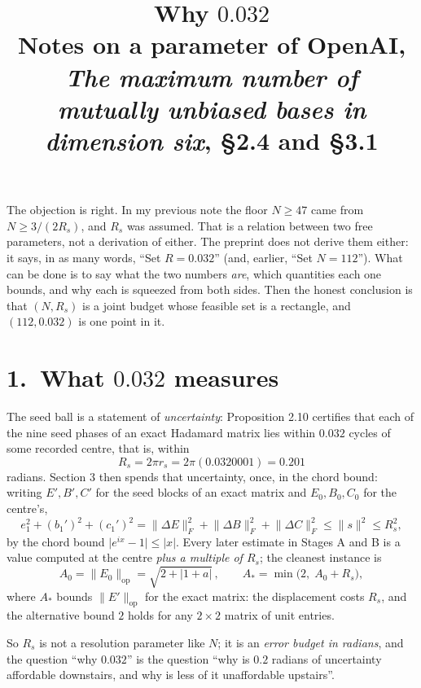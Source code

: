 \documentclass[11pt]{article}
\title{\bfseries Why $0.032$\\[6pt]
\large\normalfont Notes on a parameter of OpenAI, \emph{The maximum number of\\[1pt]
mutually unbiased bases in dimension six}, \S2.4 and \S3.1}
\author{}
\date{}
\newcommand{\abs}[1]{\lvert #1\rvert}
\newcommand{\norm}[1]{\lVert #1\rVert}
\begin{document}
\maketitle
\vspace{-2.6em}

\noindent
The objection is right. In my previous note the floor $N\ge47$ came from $N\ge 3/(2R_s)$, and $R_s$
was assumed. That is a relation between two free parameters, not a derivation of either. The preprint
does not derive them either: it says, in as many words, ``Set $R=0.032$'' (and, earlier, ``Set
$N=112$''). What can be done is to say what the two numbers \emph{are}, which quantities each one
bounds, and why each is squeezed from both sides. Then the honest conclusion is that $(N,R_s)$ is a
joint budget whose feasible set is a rectangle, and $(112,0.032)$ is one point in it.

\section*{1.\ What $0.032$ measures}

The seed ball is a statement of \emph{uncertainty}: Proposition 2.10 certifies that each of the nine
seed phases of an exact Hadamard matrix lies within $0.032$ cycles of some recorded centre, that is,
within
\[
R_s=2\pi r_s=2\pi(0.0320001)=0.201
\]
radians. Section 3 then spends that uncertainty, once, in the chord bound: writing $E',B',C'$ for the
seed blocks of an exact matrix and $E_0,B_0,C_0$ for the centre's,
\begin{equation}\label{eq:chord}
e_1^2+(b_1')^2+(c_1')^2=\norm{\Delta E}_F^2+\norm{\Delta B}_F^2+\norm{\Delta C}_F^2\le\norm{s}^2\le R_s^2 ,
\end{equation}
by the chord bound $\abs{e^{ix}-1}\le\abs{x}$. Every later estimate in Stages A and B is a value
computed at the centre \emph{plus a multiple of $R_s$}; the cleanest instance is
\begin{equation}\label{eq:Astar}
A_0=\norm{E_0}_{\mathrm{op}}=\sqrt{2+\abs{1+a}}\,,
\qquad A_*=\min\bigl(2,\;A_0+R_s\bigr),
\end{equation}
where $A_*$ bounds $\norm{E'}_{\mathrm{op}}$ for the exact matrix: the displacement costs $R_s$, and
the alternative bound $2$ holds for any $2\times2$ matrix of unit entries.

So $R_s$ is not a resolution parameter like $N$; it is an \emph{error budget in radians}, and the
question ``why $0.032$'' is the question ``why is $0.2$ radians of uncertainty affordable downstairs,
and why is less of it unaffordable upstairs''.
\end{document}
